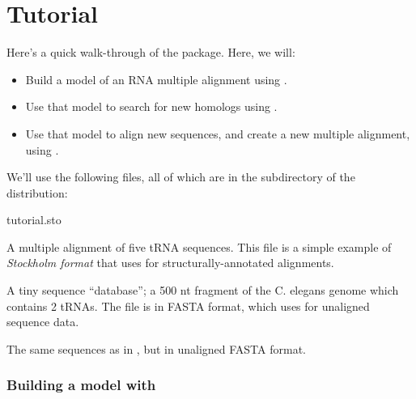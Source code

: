 \chapter{Tutorial}

Here's a quick walk-through of the package. Here, we will:
 \begin{itemize}
   \item Build a model of an RNA multiple alignment using
         .
   \item Use that model to search for new homologs using
         .
   \item Use that model to align new sequences, and create a 
         new multiple alignment, using .
  \end{itemize}

We'll use the following files, all of which are in the 
subdirectory of the distribution:

  \begin{sreitems}{tutorial.sto}
  \item[\emprog{tutorial.sto}] A multiple alignment of five tRNA
       sequences. This file is a simple example of \emph{Stockholm
       format} that  uses for structurally-annotated alignments.
  \item[\emprog{tutorial.db}]  A tiny sequence ``database''; a 500 nt fragment
       of the C. elegans genome which contains 2 tRNAs. The file is
       in FASTA format, which  uses for unaligned sequence
       data.
  \item[\emprog{tutorial.fa}] The same sequences as in , but
       in unaligned FASTA format.
  \end{sreitems}

\subsection{Building a model with }




